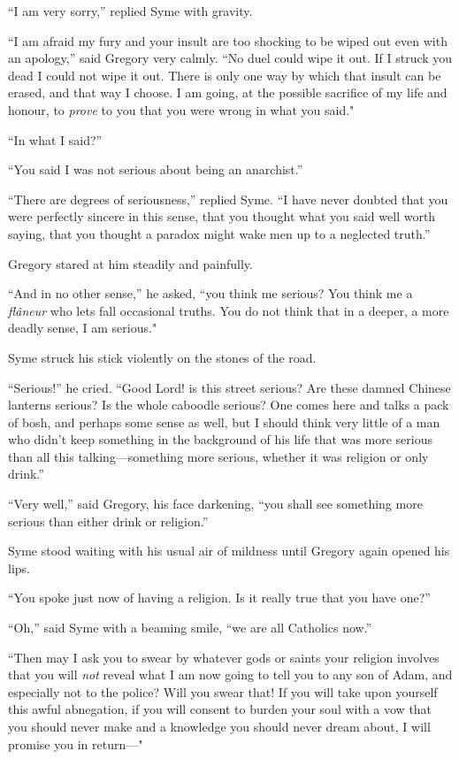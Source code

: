 \documentclass{book}
\begin{document}
“I am very sorry,” replied Syme with gravity.

“I am afraid my fury and your insult are too shocking to be wiped out even with an apology,” said Gregory very calmly. “No duel could wipe it out. If I struck you dead I could not wipe it out. There is only one way by which that insult can be erased, and that way I choose. I am going, at the possible sacrifice of my life and honour, to \emph{prove} to you that you were wrong in what you said."

“In what I said?”

“You said I was not serious about being an anarchist.”

“There are degrees of seriousness,” replied Syme. “I have never doubted that you were perfectly sincere in this sense, that you thought what you said well worth saying, that you thought a paradox might wake men up to a neglected truth.”

Gregory stared at him steadily and painfully.

“And in no other sense,” he asked, “you think me serious? You think me a \emph{flâneur} who lets fall occasional truths. You do not think that in a deeper, a more deadly sense, I am serious."

Syme struck his stick violently on the stones of the road.

“Serious!” he cried. “Good Lord! is this street serious? Are these damned Chinese lanterns serious? Is the whole caboodle serious? One comes here and talks a pack of bosh, and perhaps some sense as well, but I should think very little of a man who didn’t keep something in the background of his life that was more serious than all this talking—something more serious, whether it was religion or only drink.”

“Very well,” said Gregory, his face darkening, “you shall see something more serious than either drink or religion.”

Syme stood waiting with his usual air of mildness until Gregory again opened his lips.

“You spoke just now of having a religion. Is it really true that you have one?”

“Oh,” said Syme with a beaming smile, “we are all Catholics now.”

“Then may I ask you to swear by whatever gods or saints your religion involves that you will \emph{not} reveal what I am now going to tell you to any son of Adam, and especially not to the police? Will you swear that! If you will take upon yourself this awful abnegation, if you will consent to burden your soul with a vow that you should never make and a knowledge you should never dream about, I will promise you in return—"
\end{document}

